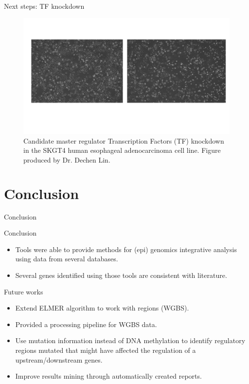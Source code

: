 \documentclass[slidestop,compress,11pt,xcolor=dvipsnames]{beamer}
\begin{document}
\begin{frame}{Next steps: TF knockdown}
 \begin{figure}[ht!]
  \centering
  \includegraphics[width=1.0\textwidth]{glioma/knockdown_TF_ESCA.pdf}
  \caption{Candidate master regulator Transcription Factors (TF) knockdown in the SKGT4 human esophageal adenocarcinoma cell line. Figure produced by Dr. Dechen Lin.}
 \end{figure}
\end{frame}

\section{Conclusion}
\begin{frame}{Conclusion}
\begin{block}{Conclusion}
  \begin{itemize}
    \item  Tools were able to provide methods for (epi) genomics integrative analysis
    using data from several databases.
    \item  Several genes identified using those tools are consistent with literature.
  \end{itemize}
\end{block}
\begin{block}{Future works}
  \begin{itemize}
    \item Extend ELMER algorithm to work with regions (WGBS).
    \item Provided a processing pipeline for WGBS data.
    \item Use mutation information instead of DNA methylation
to identify regulatory regions mutated that might have affected the
regulation of a upstream/downstream genes.
    \item Improve results mining through automatically created reports.
  \end{itemize}
\end{block}
\end{frame}
\end{document}
